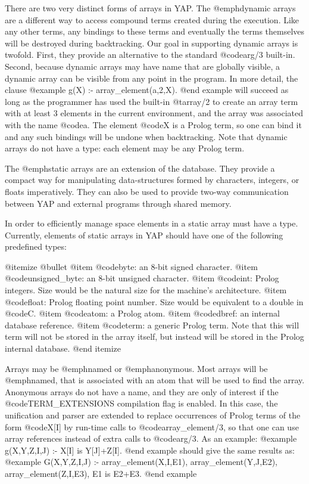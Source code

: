 {{{{{{{There are two very distinct forms of arrays in YAP. The
@emph{dynamic arrays} are a different way to access compound terms
created during the execution. Like any other terms, any bindings to
these terms and eventually the terms themselves will be destroyed during
backtracking. Our goal in supporting dynamic arrays is twofold. First,
they provide an alternative to the standard @code{arg/3}
built-in. Second, because dynamic arrays may have name that are globally
visible, a dynamic array can be visible from any point in the
program. In more detail, the clause
@example
g(X) :- array_element(a,2,X).
@end example
will succeed as long as the programmer has used the built-in @t{array/2}
to create an array term with at least 3 elements in the current
environment, and the array was associated with the name @code{a}.  The
element @code{X} is a Prolog term, so one can bind it and any such
bindings will be undone when backtracking. Note that dynamic arrays do
not have a type: each element may be any Prolog term.

The @emph{static arrays} are an extension of the database. They provide
a compact way for manipulating data-structures formed by characters,
integers, or floats imperatively. They can also be used to provide
two-way communication between YAP and external programs through
shared memory.

In order to efficiently manage space elements in a static array must
have a type. Currently, elements of static arrays in YAP should
have one of the following predefined types:

@itemize @bullet
@item  @code{byte}: an 8-bit signed character.
@item  @code{unsigned_byte}: an 8-bit unsigned character.
@item  @code{int}: Prolog integers. Size would be the natural size for
the machine's architecture.
@item  @code{float}: Prolog floating point number. Size would be equivalent
to a double in @code{C}.
@item  @code{atom}: a Prolog atom.
@item  @code{dbref}: an internal database reference.
@item  @code{term}: a generic Prolog term. Note that this will term will
not be stored in the array itself, but instead will be stored in the
Prolog internal database.
@end itemize

Arrays may be @emph{named} or @emph{anonymous}. Most arrays will be
@emph{named}, that is associated with an atom that will be used to find
the array. Anonymous arrays do not have a name, and they are only of
interest if the @code{TERM_EXTENSIONS} compilation flag is enabled. In
this case, the unification and parser are extended to replace
occurrences of Prolog terms of the form @code{X[I]} by run-time calls to
@code{array_element/3}, so that one can use array references instead of
extra calls to @code{arg/3}. As an example:
@example
g(X,Y,Z,I,J) :- X[I] is Y[J]+Z[I].
@end example
should give the same results as:
@example
G(X,Y,Z,I,J) :-
        array_element(X,I,E1),
        array_element(Y,J,E2),  
        array_element(Z,I,E3),  
        E1 is E2+E3.
@end example

}}}}}}}
